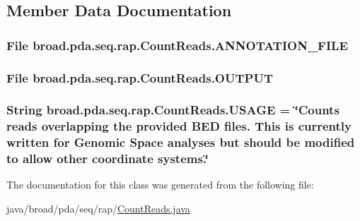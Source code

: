 \subsection{Member Data Documentation}
\hypertarget{classbroad_1_1pda_1_1seq_1_1rap_1_1_count_reads_a74e4f261731ff0e423ac6aae8773e0b6}{
\subsubsection[{A\+N\+N\+O\+T\+A\+T\+I\+O\+N\+\_\+\+F\+I\+L\+E}]{\setlength{\rightskip}{0pt plus 5cm}File broad.\+pda.\+seq.\+rap.\+Count\+Reads.\+A\+N\+N\+O\+T\+A\+T\+I\+O\+N\+\_\+\+F\+I\+L\+E}}\label{classbroad_1_1pda_1_1seq_1_1rap_1_1_count_reads_a74e4f261731ff0e423ac6aae8773e0b6}
\hypertarget{classbroad_1_1pda_1_1seq_1_1rap_1_1_count_reads_a93ffe0e2c229164b7d1824e14252155c}{
\subsubsection[{O\+U\+T\+P\+U\+T}]{\setlength{\rightskip}{0pt plus 5cm}File broad.\+pda.\+seq.\+rap.\+Count\+Reads.\+O\+U\+T\+P\+U\+T}}\label{classbroad_1_1pda_1_1seq_1_1rap_1_1_count_reads_a93ffe0e2c229164b7d1824e14252155c}
\hypertarget{classbroad_1_1pda_1_1seq_1_1rap_1_1_count_reads_af6c3679081b0db431ba14659fa05fcd0}{
\subsubsection[{U\+S\+A\+G\+E}]{\setlength{\rightskip}{0pt plus 5cm}String broad.\+pda.\+seq.\+rap.\+Count\+Reads.\+U\+S\+A\+G\+E = \char`\"{}Counts reads overlapping the provided B\+E\+D files. This is currently written for Genomic Space analyses but should be modified to allow other coordinate systems.\char`\"{}}}\label{classbroad_1_1pda_1_1seq_1_1rap_1_1_count_reads_af6c3679081b0db431ba14659fa05fcd0}


The documentation for this class was generated from the following file\+:\begin{DoxyCompactItemize}
\item 
java/broad/pda/seq/rap/\hyperlink{_count_reads_8java}{Count\+Reads.\+java}\end{DoxyCompactItemize}

